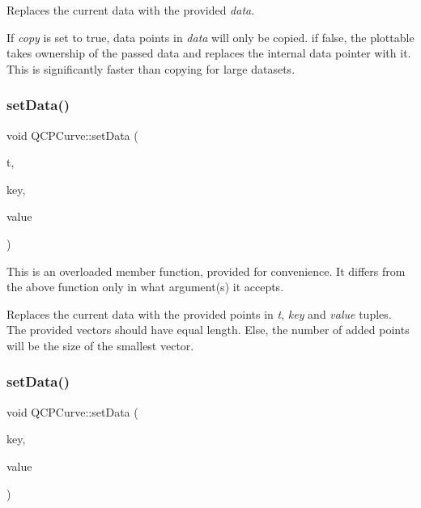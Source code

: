 Replaces the current data with the provided {\itshape data}.

If {\itshape copy} is set to true, data points in {\itshape data} will only be copied. if false, the plottable takes ownership of the passed data and replaces the internal data pointer with it. This is significantly faster than copying for large datasets. \hypertarget{class_q_c_p_curve_affe80e011e2ced62a88f614acd6ab8d1}{}\label{class_q_c_p_curve_affe80e011e2ced62a88f614acd6ab8d1} 
\subsubsection{\texorpdfstring{set\+Data()}{setData()}\hspace{0.1cm}{\footnotesize\ttfamily [2/3]}}
{\footnotesize\ttfamily void Q\+C\+P\+Curve\+::set\+Data (\begin{DoxyParamCaption}\item[{const Q\+Vector$<$ double $>$ \&}]{t,  }\item[{const Q\+Vector$<$ double $>$ \&}]{key,  }\item[{const Q\+Vector$<$ double $>$ \&}]{value }\end{DoxyParamCaption})}

This is an overloaded member function, provided for convenience. It differs from the above function only in what argument(s) it accepts.

Replaces the current data with the provided points in {\itshape t}, {\itshape key} and {\itshape value} tuples. The provided vectors should have equal length. Else, the number of added points will be the size of the smallest vector. \hypertarget{class_q_c_p_curve_a963d4c45777deef15848a8f56172d066}{}\label{class_q_c_p_curve_a963d4c45777deef15848a8f56172d066} 
\subsubsection{\texorpdfstring{set\+Data()}{setData()}\hspace{0.1cm}{\footnotesize\ttfamily [3/3]}}
{\footnotesize\ttfamily void Q\+C\+P\+Curve\+::set\+Data (\begin{DoxyParamCaption}\item[{const Q\+Vector$<$ double $>$ \&}]{key,  }\item[{const Q\+Vector$<$ double $>$ \&}]{value }\end{DoxyParamCaption})}

